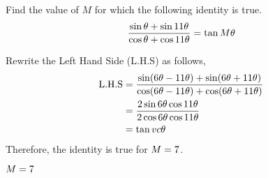 

\question[3] Find the value of $M$ for which the following identity is true.
\begin{align}
  \dfrac{\sin\theta+\sin 11\theta}{\cos\theta+\cos 11\theta} 
    = \tan M\theta \nonumber
\end{align}

\watchout

\begin{solution}[\halfpage]
  Rewrite the Left Hand Side (L.H.S) as follows,
  \begin{align}
    \text{L.H.S} &= \dfrac{\sin(6\theta-11\theta)+\sin(6\theta+11\theta)}
                      {\cos(6\theta-11\theta)+\cos(6\theta+11\theta)} \\
                 &= \dfrac{2\sin 6\theta\cos 11\theta}
                      {2\cos 6\theta\cos 11\theta} \\
                 &= \tan vc\theta
  \end{align}
  Therefore, the identity is true for $M=7$.
\end{solution}

\ifprintanswers\begin{codex}$M=7$\end{codex}\fi
